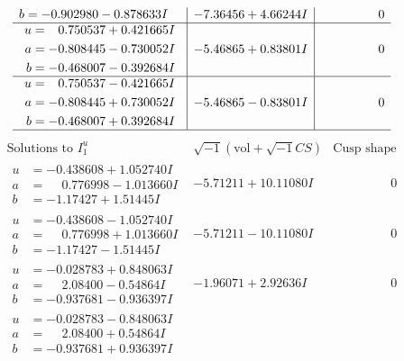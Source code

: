 \documentclass[1p]{elsarticle_modified}
\theoremstyle{definition}
\newcommand{\I}{\sqrt{-1}}
\begin{document}
$$\begin{array}{c|c|c}
\begin{aligned}
b &= -0.902980 - 0.878633 I\end{aligned}
 & -7.36456 + 4.66244 I & \phantom{-0.000000 } 0 \\ \hline\begin{aligned}
u &= \phantom{-}0.750537 + 0.421665 I \\
a &= -0.808445 - 0.730052 I \\
b &= -0.468007 - 0.392684 I\end{aligned}
 & -5.46865 + 0.83801 I & \phantom{-0.000000 } 0 \\ \hline\begin{aligned}
u &= \phantom{-}0.750537 - 0.421665 I \\
a &= -0.808445 + 0.730052 I \\
b &= -0.468007 + 0.392684 I\end{aligned}
 & -5.46865 - 0.83801 I & \phantom{-0.000000 } 0\\
 \hline 
 \end{array}$$\newpage$$\begin{array}{c|c|c}  
\text{Solutions to }I^u_{1}& \I (\text{vol} + \sqrt{-1}CS) & \text{Cusp shape}\\
 \hline 
\begin{aligned}
u &= -0.438608 + 1.052740 I \\
a &= \phantom{-}0.776998 - 1.013660 I \\
b &= -1.17427 + 1.51445 I\end{aligned}
 & -5.71211 + 10.11080 I & \phantom{-0.000000 } 0 \\ \hline\begin{aligned}
u &= -0.438608 - 1.052740 I \\
a &= \phantom{-}0.776998 + 1.013660 I \\
b &= -1.17427 - 1.51445 I\end{aligned}
 & -5.71211 - 10.11080 I & \phantom{-0.000000 } 0 \\ \hline\begin{aligned}
u &= -0.028783 + 0.848063 I \\
a &= \phantom{-}2.08400 - 0.54864 I \\
b &= -0.937681 - 0.936397 I\end{aligned}
 & -1.96071 + 2.92636 I & \phantom{-0.000000 } 0 \\ \hline\begin{aligned}
u &= -0.028783 - 0.848063 I \\
a &= \phantom{-}2.08400 + 0.54864 I \\
b &= -0.937681 + 0.936397 I\end{aligned}

\end{array}$$
\end{document}
